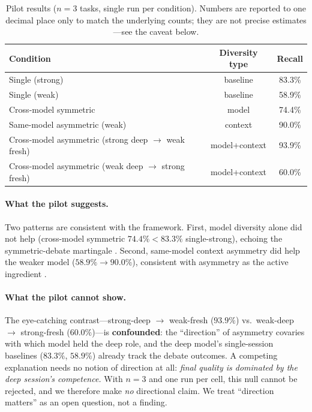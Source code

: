\documentclass[12pt]{article}
\begin{document}
\begin{table}[h]
\centering
\begin{tabular}{lcc}
\toprule
Condition & Diversity type & Recall \\
\midrule
Single (strong) & baseline & 83.3\% \\
Single (weak) & baseline & 58.9\% \\
Cross-model symmetric & model & 74.4\% \\
Same-model asymmetric (weak) & context & 90.0\% \\
Cross-model asymmetric (strong deep $\rightarrow$ weak fresh) & model+context & 93.9\% \\
Cross-model asymmetric (weak deep $\rightarrow$ strong fresh) & model+context & 60.0\% \\
\bottomrule
\end{tabular}
\caption{Pilot results ($n=3$ tasks, single run per condition). Numbers are
reported to one decimal place only to match the underlying counts; they are not
precise estimates---see the caveat below.}
\label{tab:pilot}
\end{table}

\paragraph{What the pilot suggests.} Two patterns are consistent with the
framework. First, model diversity alone did not help (cross-model symmetric
$74.4\% < 83.3\%$ single-strong), echoing the symmetric-debate martingale
\citep{choi2025debate}. Second, same-model context asymmetry did help the weaker
model ($58.9\% \rightarrow 90.0\%$), consistent with asymmetry as the active
ingredient \citep{liu2026acemad,song2026ccr}.

\paragraph{What the pilot cannot show.} The eye-catching contrast---strong-deep
$\rightarrow$ weak-fresh ($93.9\%$) vs.\ weak-deep $\rightarrow$ strong-fresh
($60.0\%$)---is \textbf{confounded}: the ``direction'' of asymmetry covaries with
which model held the deep role, and the deep model's single-session baselines
($83.3\%$, $58.9\%$) already track the debate outcomes. A competing explanation
needs no notion of direction at all: \emph{final quality is dominated by the deep
session's competence.} With $n=3$ and one run per cell, this null cannot be
rejected, and we therefore make \emph{no} directional claim. We treat
``direction matters'' as an open question, not a finding.
\end{document}
